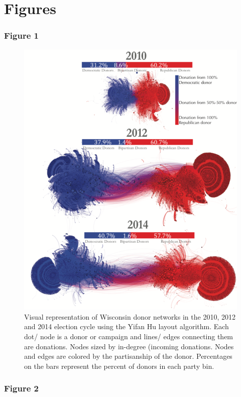 \documentclass[12pt,]{article}
\begin{document}
\newpage

\hypertarget{figures}{%
\section{Figures}\label{figures}}

\hypertarget{figure-1}{%
\subsubsection{Figure 1}\label{figure-1}}

\begin{figure}

{\centering \includegraphics[width=0.73\linewidth]{../figures/fig1} 

}

\caption{Visual representation of Wisconsin donor networks in the 2010, 2012 and 2014 election cycle using the Yifan Hu layout algorithm. Each dot/ node is a donor or campaign and lines/ edges connecting them are donations. Nodes sized by in-degree (incoming donations. Nodes and edges are colored by the partisanship of the donor. Percentages on the bars represent the percent of donors in each party bin.}\label{fig:unnamed-chunk-11}
\end{figure}

\newpage

\hypertarget{figure-2}{%
\subsubsection{Figure 2}\label{figure-2}}
\end{document}
